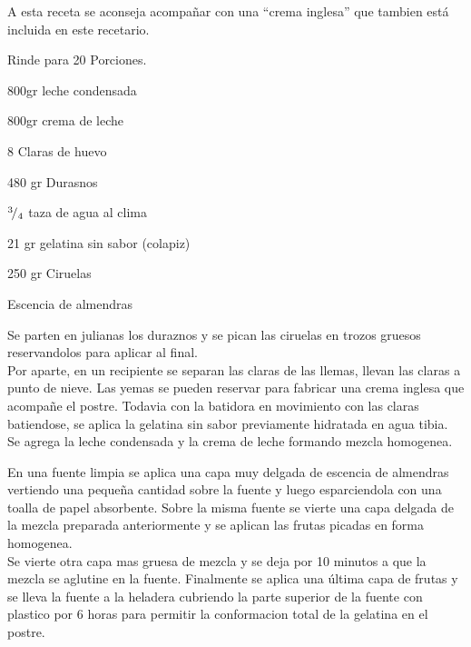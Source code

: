 A esta receta se aconseja acompañar con una “crema inglesa” que tambien está incluida en este recetario.

Rinde para 20 Porciones.\\

\begin{ingredientes}
\item 800gr leche condensada
\item 800gr crema de leche
\item 8 Claras de huevo
\item 480 gr Durasnos
\item ${}^{3}\!/_{4}$ taza de agua al clima
\item 21 gr gelatina sin sabor (colapiz)
\item 250 gr Ciruelas
\item Escencia de almendras
\end{ingredientes}
\preparacion

Se parten en julianas los duraznos y se pican las ciruelas en trozos gruesos reservandolos para aplicar al final.\\

Por aparte, en un recipiente se separan las claras de las llemas, llevan las claras a punto de nieve. Las yemas se pueden reservar para fabricar una crema inglesa que acompañe el postre. Todavia con la batidora en movimiento con las claras batiendose, se aplica la gelatina sin sabor previamente hidratada en agua tibia. Se agrega la leche condensada y la crema de leche formando mezcla homogenea.

En una fuente limpia se aplica una capa muy delgada de escencia de almendras vertiendo una pequeña cantidad sobre la fuente y luego esparciendola con una toalla de papel absorbente. Sobre la misma fuente se vierte una capa delgada de la mezcla preparada anteriormente y se aplican las frutas picadas en forma homogenea.\\

Se vierte otra capa mas gruesa de mezcla y se deja por 10 minutos a que la mezcla se aglutine en la fuente. Finalmente se aplica una última capa de frutas y se lleva la fuente a la heladera cubriendo la parte superior de la fuente con plastico por 6 horas para permitir la conformacion total de la gelatina en el postre.